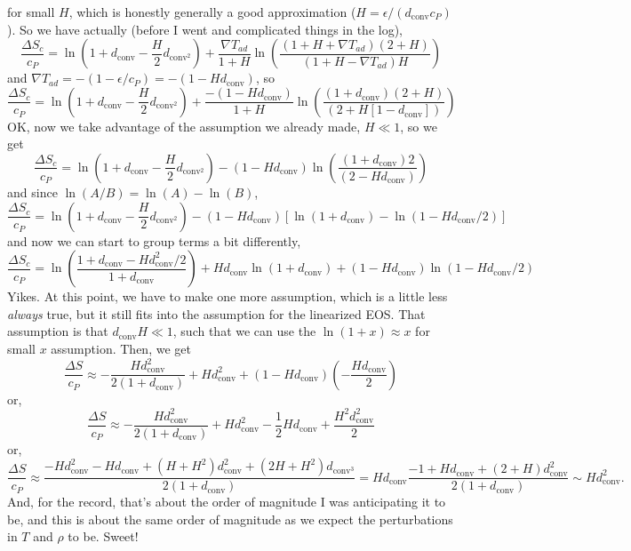 \documentclass[aps, pre, onecolumn, nofootinbib, notitlepage, groupedaddress, amsfonts, amssymb, amsmath, longbibliography]{revtex4-1}
\newcommand{\grad}{\ensuremath{\nabla}}
\begin{document}
for small $H$, which is honestly generally a good approximation ($H = \epsilon / (d_{\text{conv}}c_P)$).
So we have actually (before I went and complicated things in the log),
$$
\frac{\Delta S_c}{c_P} = \ln\left ( 1 + d_{\text{conv}} - \frac{H}{2}d_{\text{conv}^2}\right)
+ \frac{\grad T_{ad}}{1 + H}\ln\left(\frac{(1 + H + \grad T_{ad})(2 + H)}{(1 + H - \grad T_{ad})H}\right)
$$
and $\grad T_{ad} = -(1 - \epsilon / c_P) = -(1 - H d_{\text{conv}})$, so
$$
\frac{\Delta S_c}{c_P} = \ln\left ( 1 + d_{\text{conv}} - \frac{H}{2}d_{\text{conv}^2}\right)
+ \frac{-(1 - Hd_{\text{conv}})}{1 + H}\ln\left(\frac{(1 + d_{\text{conv}})(2 + H)}{(2 + H[1 - d_{\text{conv}}])}\right)
$$
OK, now we take advantage of the assumption we already made, $H \ll 1$, so we get
$$
\frac{\Delta S_c}{c_P} = \ln\left ( 1 + d_{\text{conv}} - \frac{H}{2}d_{\text{conv}^2}\right)
- (1 - Hd_{\text{conv}})\ln\left(\frac{(1 + d_{\text{conv}})2}{(2 - Hd_{\text{conv}})}\right)
$$
and since $\ln(A/B) = \ln(A) - \ln(B)$,
$$
\frac{\Delta S_c}{c_P} = \ln\left ( 1 + d_{\text{conv}} - \frac{H}{2}d_{\text{conv}^2}\right)
- (1 - Hd_{\text{conv}})\left[\ln(1 + d_{\text{conv}}) - \ln(1 - H d_{\text{conv}}/2)\right]
$$
and now we can start to group terms a bit differently,
$$
\frac{\Delta S_c}{c_P} = \ln \left(\frac{1 + d_{\text{conv}} - H d_{\text{conv}}^2 / 2}{1 + d_{\text{conv}}}\right)
+ H d_{\text{conv}}\ln(1 + d_{\text{conv}}) + (1 - H d_{\text{conv}})\ln(1 - H d_{\text{conv}}/2)
$$
Yikes. At this point, we have to make one more assumption, which is a little less \emph{always}
true, but it still fits into the assumption for the linearized EOS.  That assumption is that
$d_{\text{conv}}H \ll 1$, such that we can use the $\ln( 1 + x ) \approx x$ for small $x$ assumption.
Then, we get
$$
\frac{\Delta S}{c_P} \approx -\frac{H d_{\text{conv}}^2}{2(1 + d_{\text{conv}})} + H d_{\text{conv}}^2
+ (1 - H d_{\text{conv}})\left(-\frac{H d_{\text{conv}}}{2}\right)
$$
or,
$$
\frac{\Delta S}{c_P} \approx -\frac{H d_{\text{conv}}^2}{2(1 + d_{\text{conv}})} + H d_{\text{conv}}^2
 - \frac{1}{2}H d_{\text{conv}} + \frac{H^2 d_{\text{conv}}^2}{2}
$$
or,
$$
\frac{\Delta S}{c_P} \approx \frac{-H d_{\text{conv}}^2 - H d_{\text{conv}} + (H + H^2)d_{\text{conv}}^2 + (2H + H^2)d_{\text{conv}^3}}{2(1 + d_{\text{conv}})}
= H d_{\text{conv}}\frac{-1  + H d_{\text{conv}} + (2 + H)d_{\text{conv}}^2}{2(1 + d_{\text{conv}})}
\sim H d_{\text{conv}}^2.
$$
And, for the record, that's about the order of magnitude I was anticipating it to be, and this is about the
same order of magnitude as we expect the perturbations in $T$ and $\rho$ to be.  Sweet!
\end{document}
